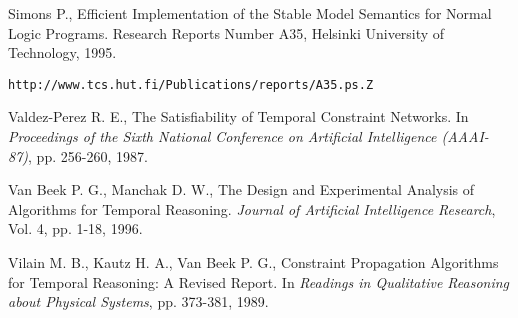 \documentclass[11pt]{report}
\begin{document}
\begin{thebibliography}{M}
      Simons P.,
      Efficient Implementation of the Stable Model Semantics for Normal Logic
      Programs.
      Research Reports Number A35, Helsinki University of Technology,
      1995.

      {\tt http://www.tcs.hut.fi/Publications/reports/A35.ps.Z}

      Valdez-Perez R. E.,
      The Satisfiability of Temporal Constraint Networks.
      In {\em Proceedings of the Sixth National Conference on Artificial Intelligence (AAAI-87)},
      pp. 256-260,
      1987.

      Van Beek P. G., Manchak D. W.,
      The Design and Experimental Analysis of Algorithms for Temporal Reasoning.
      {\em Journal of Artificial Intelligence Research},
      Vol. 4, pp. 1-18,
      1996.

      Vilain M. B., Kautz H. A., Van Beek P. G.,
      Constraint Propagation Algorithms for Temporal Reasoning: A Revised Report.
      In {\em Readings in Qualitative Reasoning about Physical Systems},
      pp. 373-381,
      1989.
  \end{thebibliography}
\end{document}
